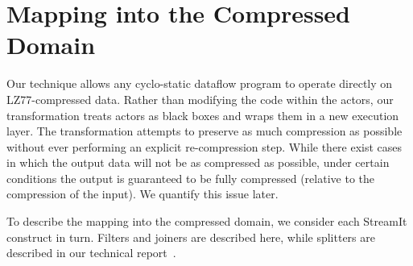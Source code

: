 
\section{Mapping into the Compressed Domain}

Our technique allows any cyclo-static dataflow program to operate
directly on LZ77-compressed data.  Rather than modifying the code
within the actors, our transformation treats actors as black boxes and
wraps them in a new execution layer.  The transformation attempts to
preserve as much compression as possible without ever performing an
explicit re-compression step.  While there exist cases in which the
output data will not be as compressed as possible, under certain
conditions the output is guaranteed to be fully compressed (relative
to the compression of the input).  We quantify this issue later.

To describe the mapping into the compressed domain, we consider each
StreamIt construct in turn.  Filters and joiners are described here,
while splitters are described in our technical
report~\cite{techreport}.

